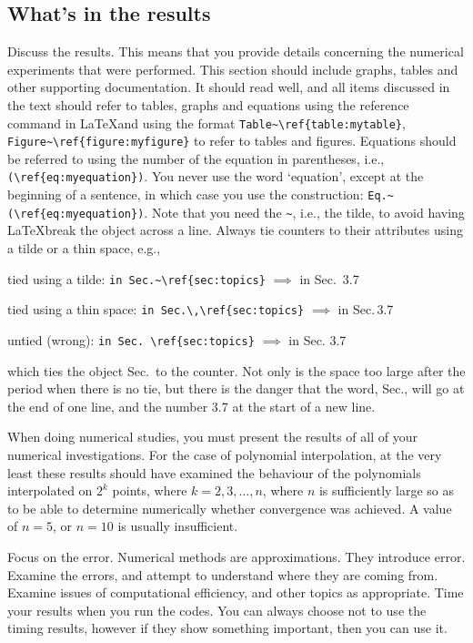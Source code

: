\subsection{What's in the results}

Discuss the results. This means that you provide details concerning
the numerical experiments that were performed. This section should
include graphs, tables and other supporting documentation. It should
read well, and all items discussed in the text should refer to tables,
graphs and equations using the reference command in \LaTeX and using
the format
\verb+Table~\ref{table:mytable}+,
\verb+Figure~\ref{figure:myfigure}+ to refer to tables and figures.
Equations should be referred to using the number
of the equation in parentheses, i.e., 
\verb+(\ref{eq:myequation})+.
You never use the word `equation', except at the beginning of a sentence,
in which case you use the construction:
\verb+Eq.~(\ref{eq:myequation})+.
Note that you need the 
\verb+~+, i.e., the tilde, to avoid having \LaTeX break the object across a
line. Always tie counters to their attributes using a tilde or a thin space,
e.g.,
\vspace*{0.4em}

 tied using a tilde:  \verb+in Sec.~\ref{sec:topics}+
 $\implies$ in Sec.~3.7

 tied using a thin space:  \verb+in Sec.\,\ref{sec:topics}+
 $\implies$ in Sec.\,3.7

 untied (wrong):  \verb+in Sec. \ref{sec:topics}+
 $\implies$ in Sec. 3.7

\vspace*{0.4em}
\noindent
which ties the object Sec.\ to the counter. Not only is the space too large
after the period when there is no tie, but there is the danger that the
word, Sec., will go at the end of one line, and the number 3.7 at the start
of a new line.


When doing numerical studies, you must present the results of all of your
numerical investigations. For the case of polynomial interpolation,
at the very least these results should have examined the behaviour of
the polynomials interpolated on $2^k$ points, where $k = 2, 3, \ldots, n$,
where $n$ is sufficiently large so as to be able to determine numerically
whether convergence was achieved. A value of $n = 5$, or $n=10$ is
usually insufficient.

Focus on the error. Numerical methods are approximations. They introduce
error. Examine the errors, and attempt to understand where they are
coming from. Examine issues of computational efficiency, and other
topics as appropriate. Time your results when you run the codes.
You can always choose not to use the timing results, however if they
show something important, then you can use it.



